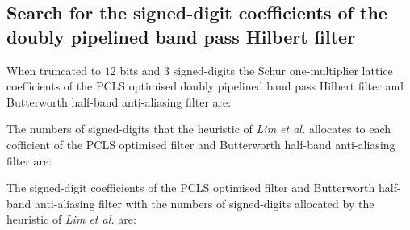 \documentclass[a4paper,twoside,10pt,english]{article}
\begin{document}
\subsection{Search for the signed-digit coefficients of the doubly pipelined band pass Hilbert filter}
When truncated to $12$ bits and $3$ signed-digits the Schur one-multiplier
lattice coefficients of the PCLS optimised doubly pipelined band pass Hilbert
filter and Butterworth half-band anti-aliasing filter are:
\begin{small}




\end{small}

The numbers of signed-digits that the heuristic of \emph{Lim et al.} allocates
to each cofficient of the PCLS optimised filter and Butterworth half-band
anti-aliasing filter are:
\begin{small}




\end{small}

The signed-digit coefficients of the PCLS optimised filter and Butterworth
half-band anti-aliasing filter with the numbers of signed-digits allocated
by the heuristic of \emph{Lim et al.} are:
\begin{small}




\end{small}
\end{document}
